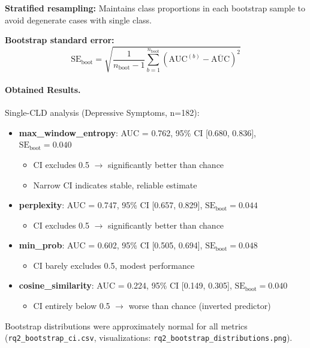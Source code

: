 \textbf{Stratified resampling:} Maintains class proportions in each bootstrap sample to avoid degenerate cases with single class.

\textbf{Bootstrap standard error:}
\[
\text{SE}_{\text{boot}} = \sqrt{\frac{1}{n_{\text{boot}}-1}\sum_{b=1}^{n_{\text{boot}}}\left(\text{AUC}^{(b)} - \overline{\text{AUC}}\right)^2}
\]

\paragraph{Obtained Results.} Single-CLD analysis (Depressive Symptoms, n=182):
\begin{itemize}
    \item \textbf{max\_window\_entropy}: AUC = 0.762, 95\% CI [0.680, 0.836], \(\text{SE}_{\text{boot}} = 0.040\)
    \begin{itemize}
        \item CI excludes 0.5 \(\rightarrow\) significantly better than chance
        \item Narrow CI indicates stable, reliable estimate
    \end{itemize}
    \item \textbf{perplexity}: AUC = 0.747, 95\% CI [0.657, 0.829], \(\text{SE}_{\text{boot}} = 0.044\)
    \begin{itemize}
        \item CI excludes 0.5 \(\rightarrow\) significantly better than chance
    \end{itemize}
    \item \textbf{min\_prob}: AUC = 0.602, 95\% CI [0.505, 0.694], \(\text{SE}_{\text{boot}} = 0.048\)
    \begin{itemize}
        \item CI barely excludes 0.5, modest performance
    \end{itemize}
    \item \textbf{cosine\_similarity}: AUC = 0.224, 95\% CI [0.149, 0.305], \(\text{SE}_{\text{boot}} = 0.040\)
    \begin{itemize}
        \item CI entirely below 0.5 \(\rightarrow\) worse than chance (inverted predictor)
    \end{itemize}
\end{itemize}

Bootstrap distributions were approximately normal for all metrics (\texttt{rq2\_bootstrap\_ci.csv}, visualizations: \texttt{rq2\_bootstrap\_distributions.png}).


